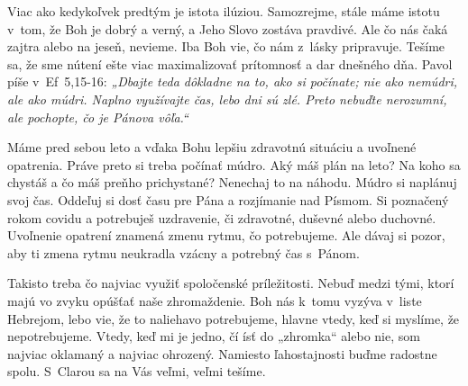 

Viac ako kedykoľvek predtým je istota ilúziou. Samozrejme, stále máme istotu v~tom, že Boh je dobrý a verný, a Jeho Slovo zostáva pravdivé. Ale čo nás čaká zajtra alebo na jeseň, nevieme. Iba Boh vie, čo nám z~lásky pripravuje. Tešíme sa, že sme nútení ešte viac maximalizovať prítomnosť a dar dnešného dňa. Pavol píše v~Ef~5,15-16: {\it „Dbajte teda dôkladne na to, ako si počínate; nie ako nemúdri, ale ako múdri. Naplno využívajte čas, lebo dni sú zlé. Preto nebuďte nerozumní, ale pochopte, čo je Pánova vôľa.“}

Máme pred sebou leto a vďaka Bohu lepšiu zdravotnú situáciu a uvoľnené opatrenia. Práve preto si treba počínať múdro.  Aký máš plán na leto? Na koho sa chystáš a čo máš preňho prichystané? Nenechaj to na náhodu. Múdro si naplánuj svoj čas. Oddeľuj si dosť času pre Pána a rozjímanie nad Písmom. Si poznačený rokom covidu a potrebuješ uzdravenie, či zdravotné, duševné alebo duchovné. Uvoľnenie opatrení znamená zmenu rytmu, čo potrebujeme. Ale dávaj si pozor, aby ti zmena rytmu neukradla vzácny a potrebný čas s~Pánom.

Takisto treba čo najviac využiť spoločenské príležitosti. Nebuď medzi tými, ktorí majú vo zvyku opúšťať naše zhromaždenie. Boh nás k~tomu vyzýva v~liste Hebrejom, lebo vie, že to naliehavo potrebujeme, hlavne vtedy, keď si myslíme, že nepotrebujeme. Vtedy, keď mi je jedno, čí ísť do „zhromka“ alebo nie,  som najviac oklamaný a najviac ohrozený. Namiesto ľahostajnosti buďme radostne spolu. S~Clarou sa na Vás veľmi, veľmi tešíme.

